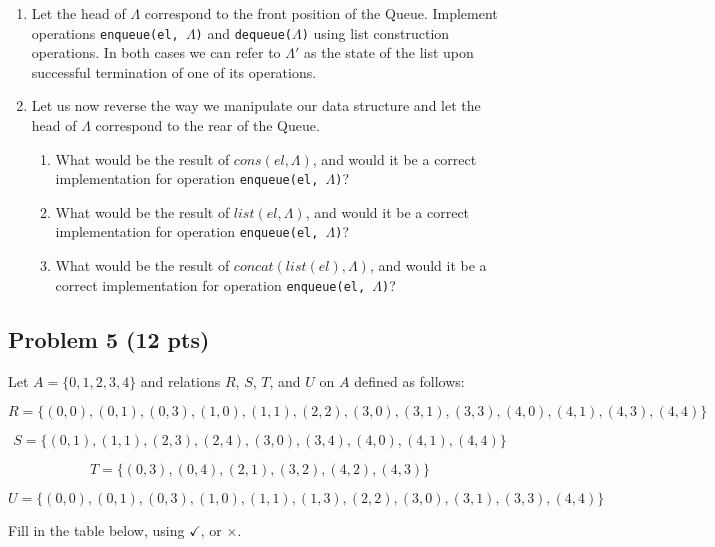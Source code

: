 \documentclass[12pt]{article}
\begin{document}
\begin{enumerate}

\item Let the head of $\Lambda$ correspond to the front position of the Queue. Implement operations \texttt{enqueue(el, $\Lambda$)} and \texttt{dequeue($\Lambda$)} using list construction operations. In both cases we can refer to $\Lambda'$ as the state of the list upon successful termination of one of its operations.

\item Let us now reverse the way we manipulate our data structure and let the head of $\Lambda$ correspond to the rear of the Queue.
\begin{enumerate}
\item What would be the result of $cons(el, \Lambda)$, and would it be a correct implementation for operation \texttt{enqueue(el, $\Lambda$)}?
\item What would be the result of $list(el, \Lambda)$, and would it be a correct implementation for operation \texttt{enqueue(el, $\Lambda$)}?
\item What would be the result of $concat(list(el), \Lambda)$, and would it be a correct implementation for operation \texttt{enqueue(el, $\Lambda$)}?
\end{enumerate}
\end{enumerate}

\newpage

\subsection{Problem 5 (12 pts)}

\noindent Let $A = \{ 0, 1, 2, 3, 4 \}$ and relations $R$, $S$, $T$, and $U$ on $A$ defined as follows:

\[ R = \{ (0, 0),  (0, 1),  (0, 3),  (1, 0),  (1, 1),  (2, 2),  (3, 0),  (3, 1), (3, 3), (4, 0), (4, 1), (4, 3), (4, 4)  \}\]

\[ S = \{ (0, 1),  (1, 1),  (2, 3),  (2, 4), (3, 0), (3, 4), (4, 0), (4, 1), (4, 4)  \}\]

\[ T = \{ (0, 3), (0, 4),  (2, 1), (3, 2), (4, 2), (4, 3) \}\]

\[ U = \{ (0, 0),  (0, 1), (0, 3), (1, 0), (1, 1), (1, 3), (2, 2), (3, 0), (3, 1), (3, 3), (4, 4) \}\]

\noindent Fill in the table below, using $\checkmark$, or $\times$.
\end{document}
